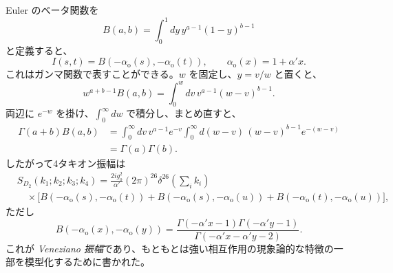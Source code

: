 Euler のベータ関数を
\begin{equation}
B(a,b)=\int_0^1dy\,y^{a-1}(1-y)^{b-1}
\tag{6.4.19}\label{eq:6.4.19}
\end{equation}
と定義すると、
\begin{equation}
I(s,t)=B(-\alpha_{\mathrm o}(s),-\alpha_{\mathrm o}(t)),
\qquad \alpha_{\mathrm o}(x)=1+\alpha'x.
\tag{6.4.20}\label{eq:6.4.20}
\end{equation}
これはガンマ関数で表すことができる。$w$ を固定し、$y=v/w$ と置くと、
\begin{equation}
w^{a+b-1}B(a,b)=\int_0^w dv\,v^{a-1}(w-v)^{b-1}.
\tag{6.4.21}\label{eq:6.4.21}
\end{equation}
両辺に $e^{-w}$ を掛け、$\int_0^\infty dw$ で積分し、まとめ直すと、
\begin{equation}
\begin{aligned}
\Gamma(a+b)B(a,b)&=\int_0^\infty dv\,v^{a-1}e^{-v}
\int_0^\infty d(w-v)\,(w-v)^{b-1}e^{-(w-v)}\\
&=\Gamma(a)\Gamma(b).
\end{aligned}
\tag{6.4.22}\label{eq:6.4.22}
\end{equation}
したがって4タキオン振幅は
\begin{equation}
\begin{aligned}
&S_{D_2}(k_1;k_2;k_3;k_4)=\frac{2ig_{\mathrm o}^2}{\alpha'}(2\pi)^{26}\delta^{26}\!\left(\sum_i k_i\right)\\
&\quad\times\bigl[B(-\alpha_{\mathrm o}(s),-\alpha_{\mathrm o}(t))
+B(-\alpha_{\mathrm o}(s),-\alpha_{\mathrm o}(u))
+B(-\alpha_{\mathrm o}(t),-\alpha_{\mathrm o}(u))\bigr],
\end{aligned}
\tag{6.4.23}\label{eq:6.4.23}
\end{equation}
ただし
\begin{equation}
B(-\alpha_{\mathrm o}(x),-\alpha_{\mathrm o}(y))
=\frac{\Gamma(-\alpha'x-1)\Gamma(-\alpha'y-1)}{\Gamma(-\alpha'x-\alpha'y-2)}.
\tag{6.4.24}\label{eq:6.4.24}
\end{equation}
これが \emph{Veneziano 振幅}であり、もともとは強い相互作用の現象論的な特徴の一部を模型化するために書かれた。

